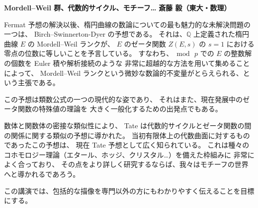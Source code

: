 \documentclass[uplatex,dvipdfmx]{jlreq}
\begin{document}
\thispagestyle{empty}


\noindent
{\large\bfseries Mordell--Weil 群、代数的サイクル、モチーフ{\ldots}}
\hfill
{\large\bfseries 斎藤 毅（東大・数理）}

\bigskip

Fermat 予想の解決以後、楕円曲線の数論についての最も魅力的な未解決問題の一つは、
Birch--Swinnerton-Dyer の予想である。
それは、$\mathbb{Q}$ 上定義された楕円曲線 $E$ の Mordell--Weil ランクが、
$E$ のゼータ関数 $Z(E,s)$ の $s=1$ における零点の位数に等しいことを予言している。
すなわち、$\bmod\, p$ での $E$ の整数解の個数を Euler 積や解析接続のような
非常に超越的な方法を用いて集めることによって、
Mordell--Weil ランクという微妙な数論的不変量がとらえられる、という主張である。

\medskip

この予想は類数公式の一つの現代的な姿であり、
それはまた、現在発展中のゼータ関数の特殊値の理論を
大きく一般化するための出発点でもある。

\medskip

数体と関数体の密接な類似性により、
Tate は代数的サイクルとゼータ関数の間の関係に関する類似の予想に導かれた。
当初有限体上の代数曲面に対するものであったこの予想は、
現在 Tate 予想として広く知られている。
これは種々のコホモロジー理論（エタール、ホッジ、クリスタル{\ldots}）を備えた枠組みに
非常によく合っており、
その点をより詳しく研究するならば、我々はモチーフの世界へと導かれるであろう。

\medskip

この講演では、包括的な描像を専門以外の方にもわかりやすく伝えることを目標にする。
\end{document}
